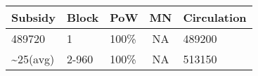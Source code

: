 \documentclass[11pt,a4paperpaper,]{report}
\begin{document}
\begin{longtable}[c]{@{}lllcl@{}}
\toprule
\begin{minipage}[b]{0.16\columnwidth}\raggedright\strut
Subsidy
\strut\end{minipage} &
\begin{minipage}[b]{0.19\columnwidth}\raggedright\strut
Block
\strut\end{minipage} &
\begin{minipage}[b]{0.10\columnwidth}\raggedright\strut
PoW
\strut\end{minipage} &
\begin{minipage}[b]{0.10\columnwidth}\centering\strut
MN
\strut\end{minipage} &
\begin{minipage}[b]{0.16\columnwidth}\raggedright\strut
Circulation
\strut\end{minipage}\tabularnewline
\midrule
\endhead
\begin{minipage}[t]{0.16\columnwidth}\raggedright\strut
489720
\strut\end{minipage} &
\begin{minipage}[t]{0.19\columnwidth}\raggedright\strut
1
\strut\end{minipage} &
\begin{minipage}[t]{0.10\columnwidth}\raggedright\strut
100\%
\strut\end{minipage} &
\begin{minipage}[t]{0.10\columnwidth}\centering\strut
NA
\strut\end{minipage} &
\begin{minipage}[t]{0.16\columnwidth}\raggedright\strut
489200
\strut\end{minipage}\tabularnewline
\begin{minipage}[t]{0.16\columnwidth}\raggedright\strut
\textasciitilde{}25(avg)
\strut\end{minipage} &
\begin{minipage}[t]{0.19\columnwidth}\raggedright\strut
2-960
\strut\end{minipage} &
\begin{minipage}[t]{0.10\columnwidth}\raggedright\strut
100\%
\strut\end{minipage} &
\begin{minipage}[t]{0.10\columnwidth}\centering\strut
NA
\strut\end{minipage} &
\begin{minipage}[t]{0.16\columnwidth}\raggedright\strut
513150
\strut\end{minipage}\tabularnewline

\end{longtable}
\end{document}
